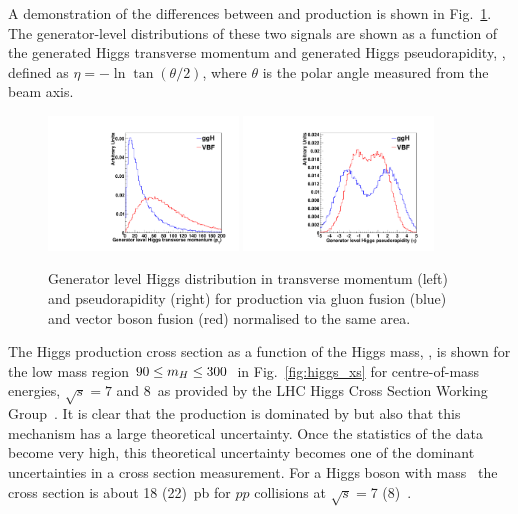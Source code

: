 A demonstration of the differences between \ggH and \VBF production is shown in Fig.~\ref{fig:gen_level}. The generator-level distributions of these two signals are shown as a function of the generated Higgs transverse momentum and generated Higgs pseudorapidity, \eta, defined as $\eta=-\ln\tan(\theta/2)$, where $\theta$ is the polar angle measured from the beam axis.
\begin{figure}
  \includegraphics[width=0.45\textwidth]{theory/plots/genPT.pdf}
  \includegraphics[width=0.45\textwidth]{theory/plots/genEta.pdf}
  \caption[Generator level Higgs distributions]{Generator level Higgs distribution in transverse momentum (left) and pseudorapidity (right) for production via gluon fusion (blue) and vector boson fusion (red) normalised to the same area.}
  \label{fig:gen_level}
\end{figure}

The \SM Higgs production cross section as a function of the Higgs mass, \mH, is shown for the low mass region $90\leq m_{H}\leq 300$~\GeV in Fig.~\ref{fig:higgs_xs} for centre-of-mass energies, $\sqrt{s}=7$ and 8~\TeV as provided by the LHC Higgs Cross Section Working Group~\cite{LHCHiggsCrossSectionWorkingGroup3}. It is clear that the production is dominated by \ggH but also that this mechanism has a large theoretical uncertainty. Once the statistics of the \LHC data become very high, this theoretical uncertainty becomes one of the dominant uncertainties in a cross section measurement. For a \SM Higgs boson with mass ~\GeV the cross section is about 18 (22)~pb for $pp$ collisions at $\sqrt{s}=$7 (8)~\TeV.

